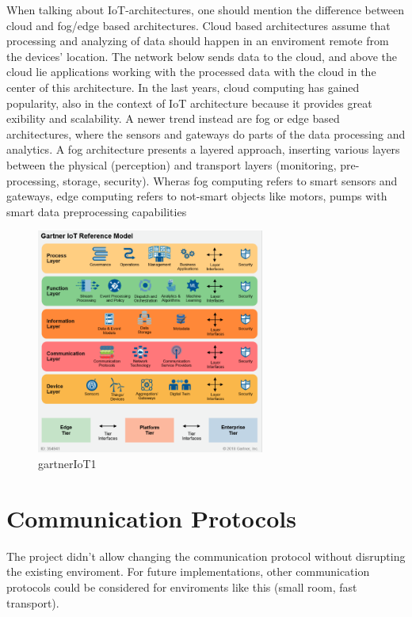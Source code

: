 When talking about IoT-architectures, one should mention the difference between cloud and fog/edge based architectures. 
Cloud based architectures assume that processing and analyzing of data should happen in an enviroment remote from the devices' location.
The network below sends data to the cloud, and above the cloud lie applications working with the processed data with the cloud in the center of this architecture.
In the last years, cloud computing has gained popularity, also in the context of IoT architecture \parencite{CloudComputing} because it provides great exibility and scalability.
A newer trend instead are fog or edge based architectures, where the sensors and gateways do parts of the data processing and analytics.
A fog architecture \parencite{FogComputing1, FogComp} presents a layered approach, inserting various layers between the physical (perception) and transport layers 
(monitoring, pre-processing, storage, security). 
Wheras fog computing refers to smart sensors and gateways, edge computing refers to not-smart objects like motors, pumps with 
smart data preprocessing capabilities \parencite{edgeFog}


\begin{figure}[th]
	\centering
	\includegraphics[width=75mm,scale=0.75]{Figures/gartnerIoT}
	\decoRule
	\caption[Gartner]{gartnerIoT1}
	\label{fig:gartnerIoT}
\end{figure}

\section{Communication Protocols}
The project didn't allow changing the communication protocol without disrupting the existing enviroment. 
For future implementations, other communication protocols could be considered for enviroments like this (small room, fast transport).
